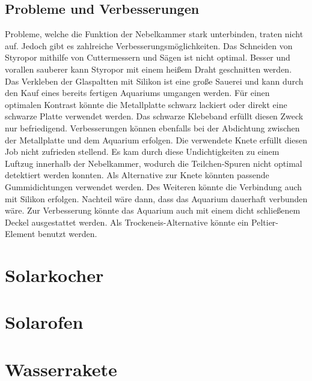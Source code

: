\documentclass[
  bibliography=totoc,     %
  captions=tableheading,  %
  titlepage=firstiscover, %
  twocolumn,
]{scrartcl}
\begin{document}
\subsection{Probleme und Verbesserungen}
Probleme, welche die Funktion der Nebelkammer stark unterbinden, traten nicht
auf. Jedoch gibt es zahlreiche Verbesserungsmöglichkeiten. Das Schneiden von
Styropor mithilfe von Cuttermessern und Sägen ist nicht optimal. Besser und
vorallen sauberer kann Styropor mit einem heißem Draht geschnitten werden. Das
Verkleben der Glaspaltten mit Silikon ist eine große Sauerei und kann durch den
Kauf eines bereits fertigen Aquariums umgangen werden. Für einen optimalen
Kontrast könnte die Metallplatte schwarz lackiert oder direkt eine schwarze
Platte verwendet werden. Das schwarze Klebeband erfüllt diesen Zweck nur
befriedigend. Verbesserungen können ebenfalls bei der Abdichtung zwischen der
Metallplatte und dem Aquarium erfolgen. Die verwendete Knete erfüllt diesen Job
nicht zufrieden stellend. Es kam durch diese Undichtigkeiten zu einem Luftzug
innerhalb der Nebelkammer, wodurch die Teilchen-Spuren nicht optimal detektiert
werden konnten. Als Alternative zur Knete könnten passende Gummidichtungen
verwendet werden. Des Weiteren könnte die Verbindung auch mit Silikon erfolgen.
Nachteil wäre dann, dass das Aquarium dauerhaft verbunden wäre. Zur Verbesserung
könnte das Aquarium auch mit einem dicht schließenem Deckel ausgestattet werden.
Als Trockeneis-Alternative könnte ein Peltier-Element benutzt werden.

\section{Solarkocher}
\section{Solarofen}
\section{Wasserrakete}
\end{document}
